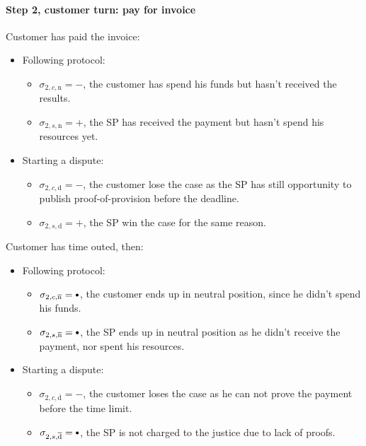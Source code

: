 \documentclass{ieeeaccess}
\newcommand\sbullet[1][.75]{\mathbin{\ThisStyle{\vcenter{\hbox{%
  \scalebox{#1}{$\SavedStyle\bullet$}}}}}%
}
\begin{document}
\paragraph{Step 2, customer turn: pay for invoice}\label{step-2-pay-for-invoice}

Customer has paid the invoice:

\begin{itemize}
\item
  Following protocol:
  \begin{itemize}
  \item
    \(\sigma_{2, c, \mathrm{n}} = -\), the customer has spend his funds but hasn't received the results.
  \item
    \(\sigma_{2, s, \mathrm{n}} = +\), the SP has received the payment but hasn't spend his resources yet.
  \end{itemize}
\item
  Starting a dispute:

  \begin{itemize}
  \item
    \(\sigma_{2, c, \mathrm{d}} = -\), the customer lose the case as the SP has still opportunity to publish proof-of-provision before the deadline.
  \item
    \(\sigma_{2, s, \mathrm{d}} = +\), the SP win the case for the same reason.
  \end{itemize}
\end{itemize}

Customer has time outed, then:

\begin{itemize}
\item
  Following protocol:
  \begin{itemize}
  \item
    \(\sigma_{2, c, \overline{\mathrm{n}}} = \sbullet\), the customer ends up in neutral position, since he didn't spend his funds.
  \item
    \(\sigma_{2, s, \overline{\mathrm{n}}} = \sbullet\), the SP ends up in neutral position as he didn't receive the payment, nor spent his resources.
  \end{itemize}
\item
  Starting a dispute:

  \begin{itemize}
  
  \item
    \(\sigma_{2, c, \overline{\mathrm{d}}} = -\), the customer loses the case as he can not prove the payment before the time limit.
  \item
    \(\sigma_{2, s, \overline{\mathrm{d}}} = \sbullet\), the SP is not charged to the justice due to lack of proofs.
  \end{itemize}
\end{itemize}
\end{document}
